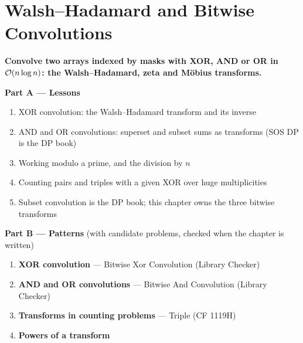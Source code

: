 \chapter{Walsh--Hadamard and Bitwise Convolutions}
\label{ch:fwht}

\begin{tcolorbox}[enhanced, colback=white, colframe=secondaryblue, boxrule=1pt, arc=2mm]
\textbf{\large\textcolor{primaryblue}{Convolve two arrays indexed by masks with XOR, AND or OR in $\mathcal{O}(n \log n)$: the Walsh--Hadamard, zeta and M\"obius transforms.}}
\end{tcolorbox}


\begin{plannedbox}
\textbf{Part A --- Lessons}
\begin{enumerate}[leftmargin=*, label=\textbf{A\arabic*.}, itemsep=1pt]
    \item XOR convolution: the Walsh--Hadamard transform and its inverse
    \item AND and OR convolutions: superset and subset sums as transforms (SOS DP is the DP book)
    \item Working modulo a prime, and the division by $n$
    \item Counting pairs and triples with a given XOR over huge multiplicities
    \item Subset convolution is the DP book; this chapter owns the three bitwise transforms
\end{enumerate}
\textbf{Part B --- Patterns} (with candidate problems, checked when the chapter is written)
\begin{enumerate}[leftmargin=*, label=\textbf{P\arabic*.}, itemsep=1pt]
    \item \textbf{XOR convolution} --- Bitwise Xor Convolution {\small\color{darkgray}(Library Checker)}
    \item \textbf{AND and OR convolutions} --- Bitwise And Convolution {\small\color{darkgray}(Library Checker)}
    \item \textbf{Transforms in counting problems} --- Triple {\small\color{darkgray}(CF 1119H)}
    \item \textbf{Powers of a transform}
\end{enumerate}
\end{plannedbox}
